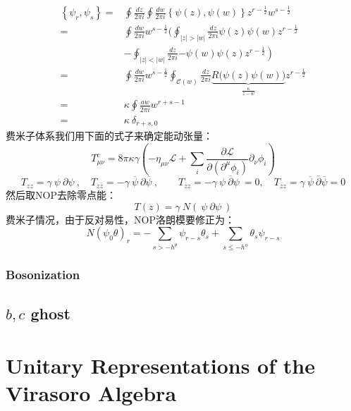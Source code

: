 \begin{equation}
	\begin{aligned}
		\left\{\psi_{r},\psi_{s}\right\}=&\oint\frac{dz}{2\pi i}\oint\frac{dw}{2\pi i}\left\{\psi(z),\psi(w)\right\}z^{r-\frac{1}{2}}w^{s-\frac{1}{2}} \\
		=&\oint\frac{dw}{2\pi i}w^{s-\frac12}\Big(\oint_{|z|>|w|}\frac{dz}{2\pi i}\psi(z)\psi(w)z^{r-\frac12} \\
		&-\oint_{|z|<|w|}\frac{dz}{2\pi i}\left.-\psi(w)\psi(z)z^{r-\frac12}\right) \\
		=&\oint\frac{dw}{2\pi i}w^{s-\frac12}\oint_{\mathcal{C}(w)}\frac{dz}{2\pi i}\underbrace{R\big(\psi(z)\psi(w)\big)}_{\frac{\kappa}{z-w}}z^{r-\frac12} \\
		=&\kappa\oint\frac{aw}{2\pi i}w^{r+s-1} \\
		=&\kappa~\delta_{r+s,0}~
	\end{aligned}
\end{equation}
费米子体系我们用下面的式子来确定能动张量：
\begin{equation}
	T_{\mu\nu}^c=8\pi\kappa\left.\gamma\left(-\eta_{\mu\nu}\mathcal{L}+\sum_i\frac{\partial\mathcal{L}}{\partial\left(\partial^\mu\phi_i\right)}\partial_\nu\phi_i\right)\right. 
\end{equation}
\begin{equation}
	T_{zz}=\gamma~\psi~\partial\psi~,\quad T_{z\overline{z}}=-\gamma~\overline{\psi}~\partial\overline{\psi}~,\quad\quad T_{\overline{z}z}=-\gamma~\psi~\overline{\partial}\psi~=0,\quad T_{\overline{z}z}=\gamma~\overline{\psi}~\overline{\partial}\overline{\psi}=0
\end{equation}
然后取NOP去除零点能：
\begin{equation}
	T(z)=\gamma\mathrm{~}N\left(\mathrm{~}\psi\mathrm{~}\partial\psi\mathrm{~}\right)
\end{equation}
费米子情况，由于反对易性，NOP洛朗模要修正为：
\begin{equation}
	\boxed{
		N\left(\psi_0\theta\right)_r=-\sum_{s>-h^\theta}\psi_{r-s}\theta_s+\sum_{s\leq-h^\phi}\theta_s\psi_{r-s}
	}
\end{equation}
\subsubsection{Bosonization}
\subsection{$b,c$ ghost}


\section{Unitary Representations of the Virasoro Algebra}
